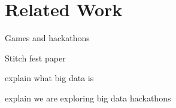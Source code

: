 \section{Related Work}


Games and hackathons


Stitch fest paper\cite{stitchfest}


explain what big data is


explain we are exploring big data hackathons
